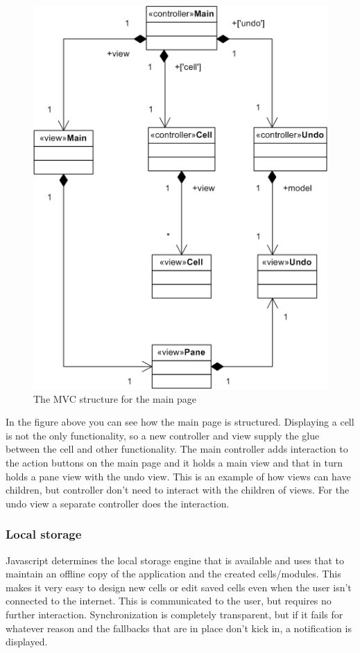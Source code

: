 \documentclass{report}
\begin{document}
					\begin{figure}[h!]
						\begin{center}
							\includegraphics{main_struct.png}
							\caption{The MVC structure for the main page}
							\label{fig: main struct}
						\end{center}
					\end{figure}	
					In the figure above you can see how the main page is structured. Displaying a cell is not the only functionality, so a new controller and view supply the glue between the cell and other functionality. The main controller adds interaction to the action buttons on the main page and it holds a main view and that in turn holds a pane view with the undo view. This is an example of how views can have children, but controller don't need to interact with the children of views. For the undo view a separate controller does the interaction.

				\subsubsection{Local storage}
					Javascript determines the local storage engine that is available and uses that to maintain an offline copy of the application and the created cells/modules. This makes it very easy to design new cells or edit saved cells even when the user isn't connected to the internet. This is communicated to the user, but requires no further interaction. Synchronization is completely transparent, but if it fails for whatever reason and the fallbacks that are in place don't kick in, a notification is displayed.
		
\end{document}
